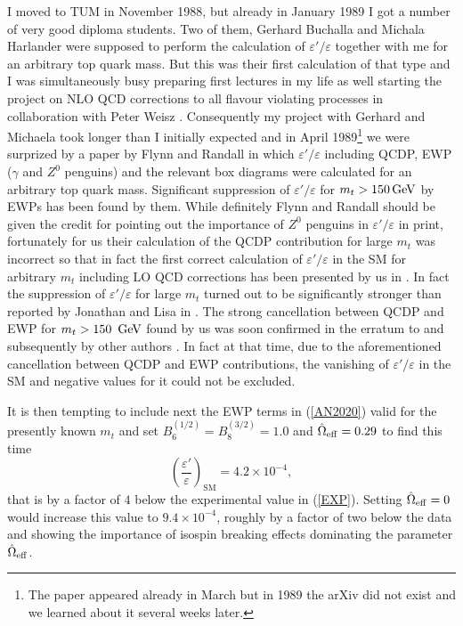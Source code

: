 \documentclass[12pt,a4paper]{article}
\newcommand{\gev}{\, {\rm GeV}}
\newcommand{\bsi}{B_6^{(1/2)}}
\newcommand{\bei}{B_8^{(3/2)}}
\def\epe{\varepsilon'/\varepsilon}
\newcommand{\be}{\begin{equation}}
\newcommand{\ee}{\end{equation}}
\begin{document}
I moved to TUM in November 1988, but already in January 1989 I got a number
of very good diploma students. Two of them, Gerhard Buchalla and Michala
Harlander were supposed to perform the calculation of $\epe$ together with me
for an arbitrary top quark mass. But this was their first calculation of that
type and I was simultaneously busy preparing first lectures in my life
 as well  starting the project on NLO QCD corrections to all flavour
violating processes in collaboration with Peter Weisz \cite{Buras:1989xd}. 
Consequently my project with Gerhard and Michaela took longer than
I initially expected and in April 1989\footnote{The paper appeared already in March but in 1989 the arXiv did not exist and we learned about it several weeks later.} we were surprized by a paper by
Flynn and Randall  \cite{Flynn:1989iu} in which $\epe$ including 
 QCDP,  EWP ($\gamma$ and $Z^0$ penguins)
and the relevant box diagrams were calculated for an arbitrary
top quark mass. Significant suppression of
$\epe$ for $m_t > 150\gev$ by EWPs has been found by them. While definitely Flynn and Randall
should be given the credit for pointing out the importance of $Z^0$ penguins
in $\epe$ in print, fortunately for us their calculation of the QCDP contribution for large $m_t$
was incorrect so that in fact the first correct calculation of $\epe$ 
in the SM for arbitrary $m_t$ including  LO QCD corrections has
been presented by us in \cite{Buchalla:1989we}. In fact the suppression of
$\epe$ for large $m_t$ turned out to be significantly stronger
than reported by Jonathan and Lisa in \cite{Flynn:1989iu}.
The strong cancellation between QCDP
and EWP for $m_t > 150~\gev$ found by us was soon confirmed in the erratum
to \cite{Flynn:1989iu} and subsequently by other authors \cite{Paschos:1991as,Lusignoli:1991bm}. In fact at that 
time, due to the aforementioned cancellation between QCDP and EWP contributions, the vanishing of $\epe$ in the SM and negative values for it could not be excluded.

It is then tempting to include next the EWP terms in (\ref{AN2020}) valid for the presently known $m_t$
and set $\bsi=\bei=1.0$ and $\hat\Omega_{\rm eff}=0.29$ to find this time
\be\label{42}
\left(\frac{\varepsilon'}{\varepsilon}\right)_{\text{SM}}= 4.2\times 10^{-4},
\ee
that is by a factor of $4$   below the experimental value in (\ref{EXP}).
Setting $\hat\Omega_{\rm eff}=0$ would increase this value to $9.4\times 10^{-4}$,
roughly by a factor of two below the data and showing the importance
of isospin breaking effects dominating the parameter  $\hat\Omega_{\rm eff}$. 
\end{document}
